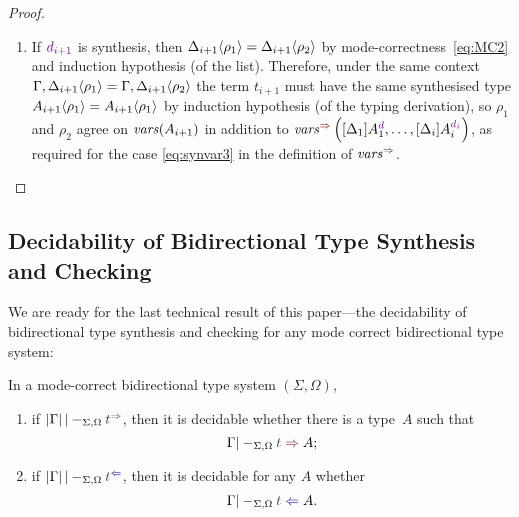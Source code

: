 \begin{proof}
\begin{itemize}
\begin{enumerate}
        \item If $\dir{d_{i+1}}$ is synthesis, then ${\Delta_{i+1}}\!\left<{\rho_1}\right> = {\Delta_{i+1}}\!\left<{\rho_2}\right>$ by mode-correctness~\eqref{eq:MC2} and induction hypothesis (of the list).
          Therefore, under the same context $\Gamma, {\Delta_{i+1}}\!\left<{\rho_1}\right> = \Gamma, {\Delta_{i+1}}\!\left<{\rho_2}\right>$ the term $t_{i+1}$ must have the same synthesised type ${A_{i+1}}\!\left<{\rho_1}\right> = {A_{i+1}}\!\left<{\rho_1}\right>$ by induction hypothesis (of the typing derivation), so $\rho_1$ and $\rho_2$ agree on $\mathit{vars}(A_{i+1})$ in addition to $\synvar\left([\Delta_{1}] A_{1}^{\dir{d}}, \ldots, [\Delta_i]A_{i}^{\dir{d_i}}\right)$, as required for the case \eqref{eq:synvar3} in the definition of $\synvar$.
      \end{enumerate}
  \end{itemize}
\end{proof}


\subsection{Decidability of Bidirectional Type Synthesis and Checking}\label{subsec:bidirectional-synthesis-checking}
We are ready for the last technical result of this paper---the decidability of bidirectional type synthesis and checking for any mode correct bidirectional type system:
\begin{theorem} \label{thm:bidirectional-type-synthesis-checking}
  In a mode-correct bidirectional type system $(\Sigma, \Omega)$,
  \begin{enumerate}
    \item if $\erase{\Gamma} |-_{\Sigma, \Omega} \isTerm{t}^{\syn}$, then it is decidable whether there is a type~$A$ such that
      \[
        \Gamma |-_{\Sigma, \Omega} \isTerm{t} \syn A;
      \]
    \item if $\erase{\Gamma} |-_{\Sigma, \Omega} \isTerm{t}^{\chk}$, then it is decidable for any $A$ whether
      \[
        \Gamma |-_{\Sigma, \Omega} \isTerm{t} \chk A.
      \]
  \end{enumerate}
\end{theorem}

